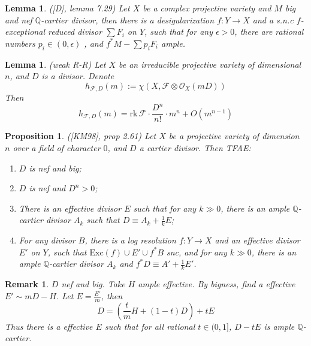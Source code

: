 \documentclass{article}
\newtheorem{prop}[defn]{Proposition}
\newtheorem{lem}[defn]{Lemma}
\newtheorem{rmk}[defn]{Remark}
\begin{document}
\begin{lem}
	([D], lemma 7.29) Let $ X $ be a complex projective variety and $ M $ big and nef $ \mathbb{Q} $-cartier divisor, then  there is a desigularization $ f:Y\to X $ and a s.n.c $ f $-exceptional reduced divisor $ \sum F_i $ on $ Y $, such that for any $ \epsilon>0 $, there are rational numbers $ p_i\in (0,\epsilon) $ , and $ f^*M-\sum p_iF_i $ ample. 
\end{lem}

\begin{lem}
	(weak R-R) Let $ X $ be an irreducible projective variety of dimensional $ n $, and $ D $ is a divisor. Denote
	$$ h_{\mathcal{F},D}(m):=\chi (X,\mathcal{F}\otimes \mathcal{O}_X(mD)) $$
	Then 
	$$ h_{\mathcal{F},D}(m)=\mathrm{rk}\,\mathcal{F}\cdot \frac{D^n}{n!}\cdot m^n+ O (m^{n-1})$$
\end{lem}

\begin{prop}
	([KM98], prop 2.61) Let $ X $ be a projective variety of dimension $ n $ over a field of character $ 0 $, and $ D $ a cartier divisor. Then TFAE:
	\begin{enumerate}
		\item $ D $ is nef and big;
		\item $ D $ is nef and $ D^n>0 $;
		\item There is an effective divisor $ E $ such that for any $ k\gg 0 $, there is an ample $ \mathbb{Q} $-cartier divisor $ A_k $ such that $ D\equiv A_k+\frac{1}{k}E $;
		\item For any divisor $ B $, there is a log resolution $ f:Y\to X $ and an effective divisor $ E' $ on $ Y $, such that $ \mathrm{Exc}(f)\cup E'\cup f^*B $ snc, and for any $ k\gg 0 $, there is an ample $ \mathbb{Q} $-cartier divisor $ A_k $ and $ f^*D\equiv A'+\frac{1}{k}E' $.  
	\end{enumerate}
\end{prop}
\begin{rmk}
	$ D $ nef and big. Take $ H $ ample effective. By bigness, find a effective $ E'\sim mD-H $. Let $ E=\frac{E'}{m} $, then
	$$ D=(\frac{t}{m}H+(1-t)D)+tE $$ 
	Thus there is a effective $ E $ such that for all rational $ t\in (0,1]  $, $ D-tE $ is ample $ \mathbb{Q} $-cartier.
\end{rmk}
\end{document}
